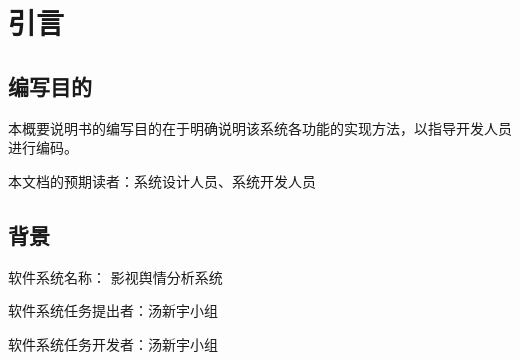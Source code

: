 \section{引言}

\subsection{编写目的}
本概要说明书的编写目的在于明确说明该系统各功能的实现方法，以指导开发人员进行编码。

本文档的预期读者：系统设计人员、系统开发人员
\subsection{背景}
软件系统名称： 影视舆情分析系统

软件系统任务提出者：汤新宇小组

软件系统任务开发者：汤新宇小组